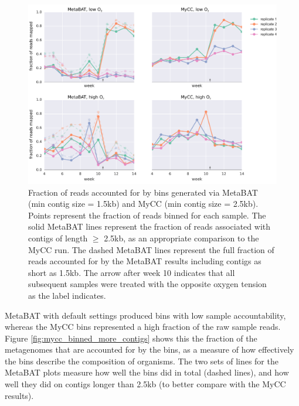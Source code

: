 \begin{figure}[H]
\centering
    \includegraphics[width=1.0\textwidth]{./tex/chapter2/figures/170201_comparable_read_coverage_for_metabat_and_mycc_3kb--INKSCAPED.pdf}
    \begin{singlespace}
    \caption[Fraction of reads accounted for by MetaBAT and MyCC bins]{
        Fraction of reads accounted for by bins generated via MetaBAT (min contig size = 1.5kb) and MyCC (min contig size = 2.5kb).
        Points represent the fraction of reads binned for each sample.
        The solid MetaBAT lines represent the fraction of reads associated with contigs of length $\geq$ 2.5kb, as an appropriate comparison to the MyCC run.
        The dashed MetaBAT lines represent the full fraction of reads accounted for by the MetaBAT results including contigs as short as 1.5kb.
        The arrow after week 10 indicates that all subsequent samples were treated with the opposite oxygen tension as the label indicates.
    }
    \label{fig:binning_frac_reads_mapped}
    \end{singlespace}
\end{figure}

MetaBAT with default settings produced bins with low sample accountability, whereas the MyCC bins represented a high fraction of the raw sample reads.
Figure \ref{fig:mycc_binned_more_contigs} shows this the fraction of the metagenomes that are accounted for by the bins, as a measure of how effectively the bins describe the composition of organisms.
The two sets of lines for the MetaBAT plots measure how well the bins did in total (dashed lines), and how well they did on contigs longer than 2.5kb (to better compare with the MyCC results).


